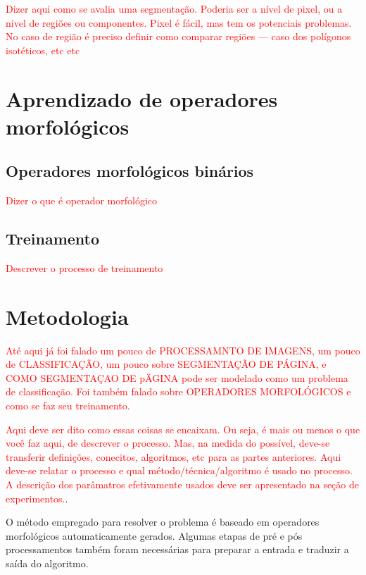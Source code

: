 \documentclass[a4paper,11pt]{article}
\newcommand{\TODO}[1]{\textcolor{red}{#1}}
\begin{document}
\TODO{Dizer aqui como se avalia uma segmentação. Poderia ser a nível
  de pixel, ou a nivel de regiões ou componentes. Pixel é fácil, mas
  tem os potenciais problemas. No caso de região é preciso definir
  como comparar regiões --- caso dos polígonos isotéticos, etc etc}






\section{Aprendizado de operadores morfológicos}

\subsection{Operadores morfológicos binários}

\TODO{Dizer o que é operador morfológico}


\subsection{Treinamento}

\TODO{Descrever o processo de treinamento}







\section{Metodologia}

\TODO{Até aqui já foi falado um pouco de PROCESSAMNTO DE IMAGENS, um
  pouco de CLASSIFICAÇÃO, um pouco sobre SEGMENTAÇÃO DE PÁGINA, e COMO
  SEGMENTAÇAO DE pÄGINA pode ser modelado como um problema de
  classificação. Foi também falado sobre OPERADORES MORFOLÓGICOS e
  como se faz seu treinamento.}

\TODO{Aqui deve ser dito como essas coisas se encaixam. Ou seja, é
  mais ou menos o que você faz aqui, de descrever o processo. Mas, na
  medida do possível, deve-se transferir definições, conecitos,
  algoritmos, etc para as partes anteriores. Aqui deve-se relatar o
  processo e qual método/técnica/algoritmo é usado no processo. A
  descrição dos parâmatros efetivamente usados deve ser apresentado na
seção de experimentos.}.

O método empregado para resolver o problema é baseado em operadores morfológicos automaticamente gerados. Algumas etapas de pré e pós processamentos também foram necessárias para preparar a entrada e traduzir a saída do algoritmo.
\end{document}
